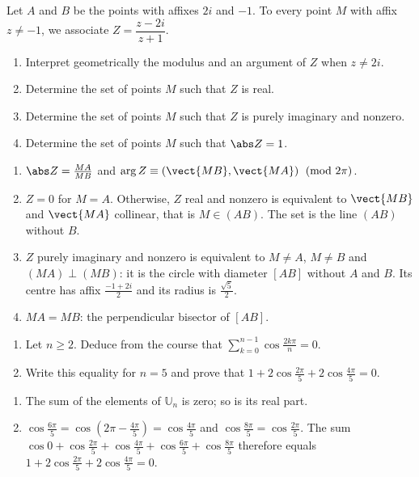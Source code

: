 \begin{exercise}
Let $A$ and $B$ be the points with affixes $2i$ and $-1$. To every point $M$ with affix $z\neq-1$, we associate $Z=\dfrac{z-2i}{z+1}$.
\begin{enumerate}
\item Interpret geometrically the modulus and an argument of $Z$ when $z\neq2i$.
\item Determine the set of points $M$ such that $Z$ is real.
\item Determine the set of points $M$ such that $Z$ is purely imaginary and nonzero.
\item Determine the set of points $M$ such that $\abs Z=1$.
\end{enumerate}
\end{exercise}
\begin{solution}
\begin{enumerate}
\item $\abs Z=\frac{MA}{MB}$ and $\arg Z\equiv\left(\vect{MB},\vect{MA}\right)\pmod{2\pi}$.
\item $Z=0$ for $M=A$. Otherwise, $Z$ real and nonzero is equivalent to $\vect{MB}$ and $\vect{MA}$ collinear, that is $M\in(AB)$. The set is the line $(AB)$ without $B$.
\item $Z$ purely imaginary and nonzero is equivalent to $M\neq A$, $M\neq B$ and $(MA)\perp(MB)$: it is the circle with diameter $[AB]$ without $A$ and $B$. Its centre has affix $\frac{-1+2i}2$ and its radius is $\frac{\sqrt5}2$.
\item $MA=MB$: the perpendicular bisector of $[AB]$.
\end{enumerate}
\end{solution}

\begin{exercise}
\begin{enumerate}
\item Let $n\ge2$. Deduce from the course that $\displaystyle\sum_{k=0}^{n-1}\cos\frac{2k\pi}n=0$.
\item Write this equality for $n=5$ and prove that $1+2\cos\frac{2\pi}5+2\cos\frac{4\pi}5=0$.
\end{enumerate}
\end{exercise}
\begin{solution}
\begin{enumerate}
\item The sum of the elements of $\mathbb U_n$ is zero; so is its real part.
\item $\cos\frac{6\pi}5=\cos\left(2\pi-\frac{4\pi}5\right)=\cos\frac{4\pi}5$ and $\cos\frac{8\pi}5=\cos\frac{2\pi}5$. The sum $\cos0+\cos\frac{2\pi}5+\cos\frac{4\pi}5+\cos\frac{6\pi}5+\cos\frac{8\pi}5$ therefore equals $1+2\cos\frac{2\pi}5+2\cos\frac{4\pi}5=0$.
\end{enumerate}
\end{solution}

